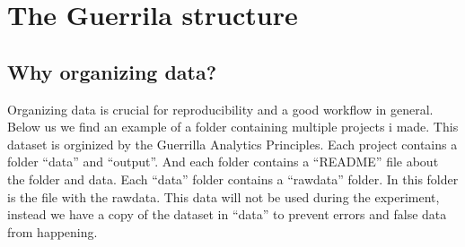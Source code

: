 \documentclass[
]{book}
\begin{document}
\hypertarget{the-guerrila-structure}{%
\chapter{The Guerrila structure}\label{the-guerrila-structure}}

\hypertarget{why-organizing-data}{%
\section{Why organizing data?}\label{why-organizing-data}}

Organizing data is crucial for reproducibility and a good workflow in general. Below us we find an example of a folder containing multiple projects i made. This dataset is orginized by the Guerrilla Analytics Principles. Each project contains a folder ``data'' and ``output''. And each folder contains a ``README'' file about the folder and data. Each ``data'' folder contains a ``rawdata'' folder. In this folder is the file with the rawdata. This data will not be used during the experiment, instead we have a copy of the dataset in ``data'' to prevent errors and false data from happening.
\end{document}
